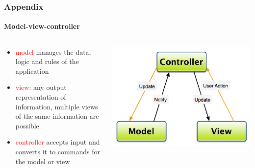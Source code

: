 \documentclass[14pt]{beamer}
\begin{document}
\begin{frame}
  \frametitle{Appendix}
  \framesubtitle{Model-view-controller}


\fontsize{12pt}{7.2}\selectfont

  \begin{columns}
    \begin{column}{0.4\textwidth}

      \begin{itemize}
        \item \textcolor{red}{model} manages the data, logic and rules of the application
        \item \textcolor{red}{view}: any output representation of information, multiple views of the same information are possible
        \item \textcolor{red}{controller} accepts input and converts it to commands for the model or view
      \end{itemize}

    \end{column}

    \begin{column}{0.5\textwidth}
      \begin{center}
        \includegraphics[scale=0.45]{images/MVC.png}
      \end{center}

    \end{column}
  \end{columns}

\end{frame}
\end{document}
